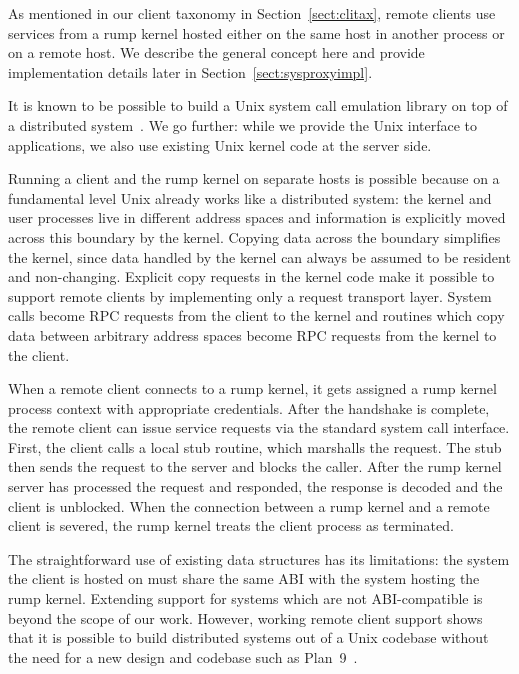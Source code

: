 As mentioned in our client taxonomy in Section~\ref{sect:clitax},
remote clients use services from a rump kernel hosted either on
the same host in another process or on a remote host.  We describe
the general concept here and provide implementation details later
in Section~\ref{sect:sysproxyimpl}.

It is known to be possible to build a Unix system call emulation
library on top of a distributed system~\cite{mullender:amoeba}.
We go further: while we provide the Unix interface to applications,
we also use existing Unix kernel code at the server side.

Running a client and the rump kernel on separate hosts is possible
because on a fundamental level Unix already works like a
distributed system: the kernel and user processes live in different
address spaces and information is explicitly moved across this boundary
by the kernel.  Copying data across the boundary simplifies the kernel,
since data handled by the kernel can always be assumed to be resident and
non-changing.  Explicit copy requests in the kernel code make it possible
to support remote clients by implementing only a request transport layer.
System calls become RPC requests from the client to the kernel
and routines which copy data between arbitrary address spaces become
RPC requests from the kernel to the client.

When a remote client connects to a rump kernel, it gets assigned a rump
kernel process context with appropriate credentials.  After the handshake
is complete, the remote client can issue service requests via the standard
system call interface.  First, the client calls a local stub routine,
which marshalls the request.  The stub then sends the request to the
server and blocks the caller.  After the rump kernel server has processed
the request and responded, the response is decoded and the client is
unblocked.  When the connection between a rump kernel and a remote client
is severed, the rump kernel treats the client process as terminated.

The straightforward use of existing data structures has its limitations:
the system the client is hosted on must share the same ABI with the
system hosting the rump kernel.  Extending support for systems which are
not ABI-compatible is beyond the scope of our work.  However, working
remote client support shows that it is possible to build distributed
systems out of a Unix codebase without the need for a new design and
codebase such as Plan~9~\cite{pike:plan9}.

